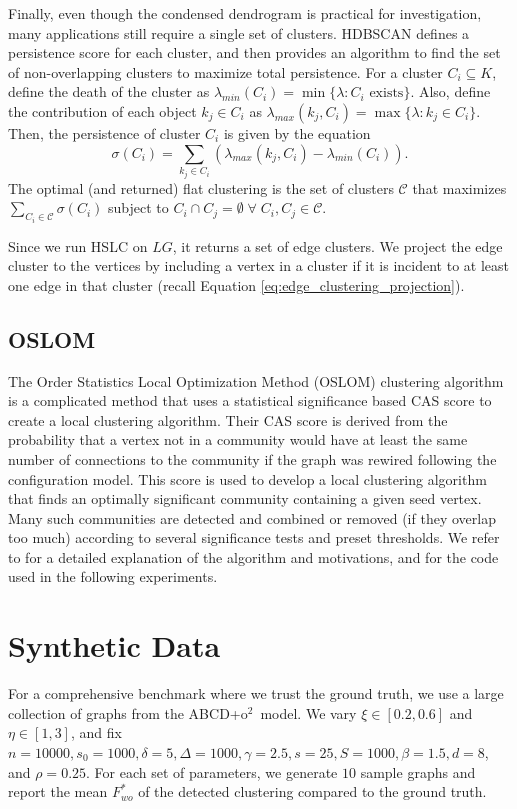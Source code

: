 \documentclass[review,los,12pt]{ryethesis}
\newcommand{\abcdoo}{{ABCD+o$^2$}}
\begin{document}
Finally, even though the condensed dendrogram is practical for investigation, many applications still require a single set of clusters.
HDBSCAN \cite{hdbscan} defines a persistence score for each cluster, and then provides an algorithm to find the set of non-overlapping clusters to maximize total persistence.
For a cluster $C_i \subseteq K$, define the death of the cluster as $\lambda_{min}(C_i) = \min\{\lambda: C_i \text{ exists} \}$.
Also, define the contribution of each object $k_j \in C_i$ as $\lambda_{max}(k_j, C_i) = \max\{\lambda : k_j \in C_i\}$.
Then, the persistence of cluster $C_i$ is given by the equation
\begin{equation}
    \sigma(C_i) = \sum_{k_j \in C_i} \left(\lambda_{max}(k_j, C_i) - \lambda_{min}(C_i)\right).
\end{equation}
The optimal (and returned) flat clustering is the set of clusters $\mathcal{C}$ that maximizes\\ $\sum_{C_i \in \mathcal{C}} \sigma(C_i)$ subject to $C_i \cap C_j = \emptyset \;\forall\; C_i, C_j \in \mathcal{C}$.

Since we run HSLC on $LG$, it returns a set of edge clusters.
We project the edge cluster to the vertices by including a vertex in a cluster if it is incident to at least one edge in that cluster (recall Equation \ref{eq:edge_clustering_projection}).

\subsection{OSLOM}
The Order Statistics Local Optimization Method (OSLOM) clustering algorithm \cite{oslom} is a complicated method that uses a statistical significance \cite{communitysignificance} based CAS score to create a local clustering \cite{localclustering} algorithm.
Their CAS score is derived from the probability that a vertex not in a community would have at least the same number of connections to the community if the graph was rewired following the configuration model.
This score is used to develop a local clustering algorithm that finds an optimally significant community containing a given seed vertex.
Many such communities are detected and combined or removed (if they overlap too much) according to several significance tests and preset thresholds.
We refer to \cite{oslom} for a detailed explanation of the algorithm and motivations, and \cite{oslomcode} for the code used in the following experiments.

\section{Synthetic Data}
For a comprehensive benchmark where we trust the ground truth, we use a large collection of graphs from the \abcdoo\ model.
We vary $\xi \in [0.2, 0.6]$ and $\eta \in [1,3]$, and fix $n=10000, s_0=1000, \delta=5, \Delta=1000, \gamma=2.5, s=25, S=1000, \beta=1.5, d=8$, and $\rho=0.25$.
For each set of parameters, we generate $10$ sample graphs and report the mean $F^*_{wo}$ of the detected clustering compared to the ground truth.
\end{document}
